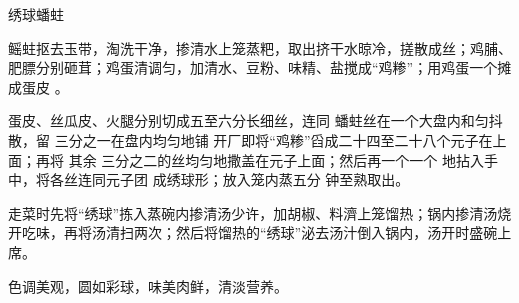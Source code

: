 \begin{recipe}{绣球蟠蛀}

\ingredients


\cooking

\step 鳐蛀抠去玉带，淘洗干净，掺清水上笼蒸粑，取出挤干水晾冷，搓散成丝；鸡脯、
肥膘分别砸茸；鸡蛋清调匀，加清水、豆粉、味精、盐搅成“鸡糁”；用鸡蛋一个摊成蛋皮
。

蛋皮、丝瓜皮、火腿分别切成五至六分长细丝，连同 蟠蛀丝在一个大盘内和匀抖散，留
三分之一在盘内均匀地铺 开厂即将“鸡糁”舀成二十四至二十八个元子在上面；再将 其余
三分之二的丝均匀地撒盖在元子上面；然后再一个一个 地拈入手中，将各丝连同元子团
成绣球形；放入笼内蒸五分 钟至熟取出。

\step 走菜时先将“绣球”拣入蒸碗内掺清汤少许，加胡椒、料濟上笼馏热；锅内掺清汤烧
开吃味，再将汤清扫两次；然后将馏热的“绣球”泌去汤汁倒入锅内，汤开时盛碗上席。

\features

色调美观，圆如彩球，味美肉鲜，清淡营养。

\end{recipe}

